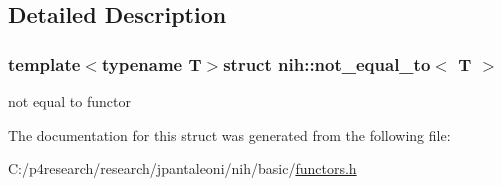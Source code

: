 \subsection{\-Detailed \-Description}
\subsubsection*{template$<$typename T$>$struct nih\-::not\-\_\-equal\-\_\-to$<$ T $>$}

not equal to functor 

\-The documentation for this struct was generated from the following file\-:\begin{DoxyCompactItemize}
\item 
\-C\-:/p4research/research/jpantaleoni/nih/basic/\hyperlink{functors_8h}{functors.\-h}\end{DoxyCompactItemize}
